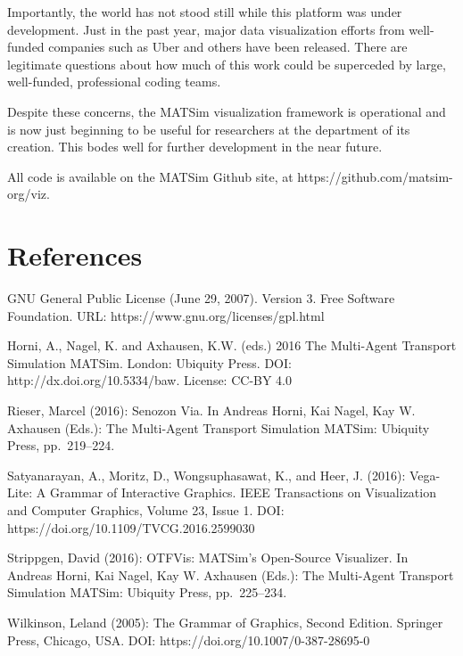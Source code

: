 Importantly, the world has not stood still while this platform was under
development. Just in the past year, major data visualization efforts
from well-funded companies such as Uber and others have been released.
There are legitimate questions about how much of this work could be
superceded by large, well-funded, professional coding teams.

Despite these concerns, the MATSim visualization framework is
operational and is now just beginning to be useful for researchers at
the department of its creation. This bodes well for further development
in the near future.

All code is available on the MATSim Github site, at
https://github.com/matsim-org/viz.

\hypertarget{references}{%
\section{References}\label{references}}

GNU General Public License (June 29, 2007). Version 3. Free Software
Foundation. URL: https://www.gnu.org/licenses/gpl.html

Horni, A., Nagel, K. and Axhausen, K.W. (eds.) 2016 The Multi-Agent
Transport Simulation MATSim. London: Ubiquity Press. DOI:
http://dx.doi.org/10.5334/baw. License: CC-BY 4.0

Rieser, Marcel (2016): Senozon Via. In Andreas Horni, Kai Nagel, Kay W.
Axhausen (Eds.): The Multi-Agent Transport Simulation MATSim: Ubiquity
Press, pp.~219--224.

Satyanarayan, A., Moritz, D., Wongsuphasawat, K., and Heer, J. (2016):
Vega-Lite: A Grammar of Interactive Graphics. IEEE Transactions on
Visualization and Computer Graphics, Volume 23, Issue 1. DOI:
https://doi.org/10.1109/TVCG.2016.2599030

Strippgen, David (2016): OTFVis: MATSim's Open-Source Visualizer. In
Andreas Horni, Kai Nagel, Kay W. Axhausen (Eds.): The Multi-Agent
Transport Simulation MATSim: Ubiquity Press, pp.~225--234.

Wilkinson, Leland (2005): The Grammar of Graphics, Second Edition.
Springer Press, Chicago, USA. DOI: https://doi.org/10.1007/0-387-28695-0
